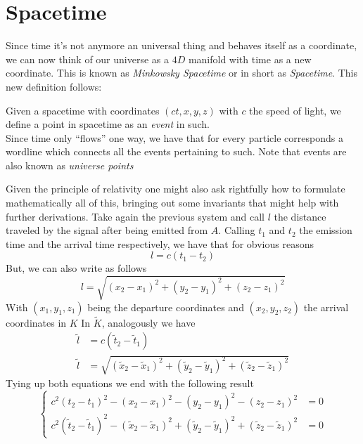 \documentclass[../electromagnetism.tex]{subfiles}
\begin{document}
\section{Spacetime}
Since time it's not anymore an universal thing and behaves itself as a coordinate, we can now think of our universe as a $4D$ manifold with time as a new coordinate. This is known as \emph{Minkowsky Spacetime} or in short as \emph{Spacetime}. This new definition follows:
\begin{dfn}[Event]
	Given a spacetime with coordinates $(ct,x,y,z)$ with $c$ the speed of light, we define a point in spacetime as an \emph{event} in such.\\
	Since time only ``flows'' one way, we have that for every particle corresponds a wordline which connects all the events pertaining to such. Note that events are also known as \emph{universe points}
\end{dfn}
Given the principle of relativity one might also ask rightfully how to formulate mathematically all of this, bringing out some invariants that might help with further derivations. Take again the previous system and call $l$ the distance traveled by the signal after being emitted from $A$. Calling $t_1$ and $t_2$ the emission time and the arrival time respectively, we have that for obvious reasons
\begin{equation}
	l=c(t_1-t_2)
	\label{eq:ltrd1}
\end{equation}
But, we can also write as follows
\begin{equation}
	l=\sqrt{(x_2-x_1)^2+(y_2-y_1)^2+(z_2-z_1)^2}
	\label{eq:ltrd2}
\end{equation}
With $(x_1,y_1,z_1)$ being the departure coordinates and $(x_2,y_2,z_2)$ the arrival coordinates in $K$
In $\tilde{K}$, analogously we have
\begin{equation}
	\begin{aligned}
		\tilde{l}&=c(\tilde{t}_2-\tilde{t}_1)\\
		\tilde{l}&=\sqrt{(\tilde{x}_2-\tilde{x}_1)^2+(\tilde{y}_2-\tilde{y}_1)^2+(\tilde{z}_2-\tilde{z}_1)^2}
	\end{aligned}
	\label{eq:ltrdtil}
\end{equation}
Tying up both equations we end with the following result
\begin{equation}
	\left\{\begin{aligned}
		c^2(t_2-t_1)^2-(x_2-x_1)^2-(y_2-y_1)^2-(z_2-z_1)^2&=0\\
		c^2(\tilde{t}_2-\tilde{t}_1)^2-(\tilde{x}_2-\tilde{x}_1)^2+(\tilde{y}_2-\tilde{y}_1)^2+(\tilde{z}_2-\tilde{z}_1)^2&=0
	\end{aligned}\right.
	\label{eq:interval1}
\end{equation}
\end{document}

